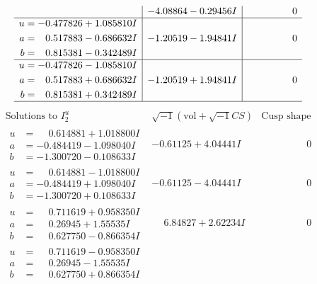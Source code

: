 \documentclass[1p]{elsarticle_modified}
\theoremstyle{definition}
\newcommand{\I}{\sqrt{-1}}
\begin{document}
$$\begin{array}{c|c|c}
 & -4.08864 - 0.29456 I & \phantom{-0.000000 } 0 \\ \hline\begin{aligned}
u &= -0.477826 + 1.085810 I \\
a &= \phantom{-}0.517883 - 0.686632 I \\
b &= \phantom{-}0.815381 - 0.342489 I\end{aligned}
 & -1.20519 - 1.94841 I & \phantom{-0.000000 } 0 \\ \hline\begin{aligned}
u &= -0.477826 - 1.085810 I \\
a &= \phantom{-}0.517883 + 0.686632 I \\
b &= \phantom{-}0.815381 + 0.342489 I\end{aligned}
 & -1.20519 + 1.94841 I & \phantom{-0.000000 } 0\\
 \hline 
 \end{array}$$\newpage$$\begin{array}{c|c|c}  
\text{Solutions to }I^u_{2}& \I (\text{vol} + \sqrt{-1}CS) & \text{Cusp shape}\\
 \hline 
\begin{aligned}
u &= \phantom{-}0.614881 + 1.018800 I \\
a &= -0.484419 - 1.098040 I \\
b &= -1.300720 - 0.108633 I\end{aligned}
 & -0.61125 + 4.04441 I & \phantom{-0.000000 } 0 \\ \hline\begin{aligned}
u &= \phantom{-}0.614881 - 1.018800 I \\
a &= -0.484419 + 1.098040 I \\
b &= -1.300720 + 0.108633 I\end{aligned}
 & -0.61125 - 4.04441 I & \phantom{-0.000000 } 0 \\ \hline\begin{aligned}
u &= \phantom{-}0.711619 + 0.958350 I \\
a &= \phantom{-}0.26945 + 1.55535 I \\
b &= \phantom{-}0.627750 - 0.866354 I\end{aligned}
 & \phantom{-}6.84827 + 2.62234 I & \phantom{-0.000000 } 0 \\ \hline\begin{aligned}
u &= \phantom{-}0.711619 - 0.958350 I \\
a &= \phantom{-}0.26945 - 1.55535 I \\
b &= \phantom{-}0.627750 + 0.866354 I\end{aligned}

\end{array}$$
\end{document}
